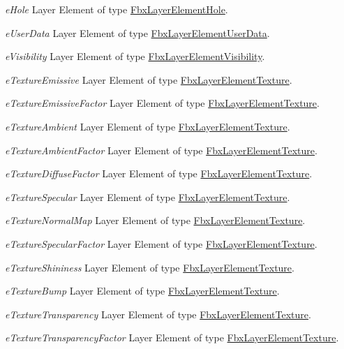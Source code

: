 \begin{DoxyItemize}
\item {\itshape e\+Hole} Layer Element of type \hyperlink{class_fbx_layer_element_hole}{Fbx\+Layer\+Element\+Hole}.
\item {\itshape e\+User\+Data} Layer Element of type \hyperlink{class_fbx_layer_element_user_data}{Fbx\+Layer\+Element\+User\+Data}.
\item {\itshape e\+Visibility} Layer Element of type \hyperlink{class_fbx_layer_element_visibility}{Fbx\+Layer\+Element\+Visibility}.
\item {\itshape e\+Texture\+Emissive} Layer Element of type \hyperlink{class_fbx_layer_element_texture}{Fbx\+Layer\+Element\+Texture}.
\item {\itshape e\+Texture\+Emissive\+Factor} Layer Element of type \hyperlink{class_fbx_layer_element_texture}{Fbx\+Layer\+Element\+Texture}.
\item {\itshape e\+Texture\+Ambient} Layer Element of type \hyperlink{class_fbx_layer_element_texture}{Fbx\+Layer\+Element\+Texture}.
\item {\itshape e\+Texture\+Ambient\+Factor} Layer Element of type \hyperlink{class_fbx_layer_element_texture}{Fbx\+Layer\+Element\+Texture}.
\item {\itshape e\+Texture\+Diffuse\+Factor} Layer Element of type \hyperlink{class_fbx_layer_element_texture}{Fbx\+Layer\+Element\+Texture}.
\item {\itshape e\+Texture\+Specular} Layer Element of type \hyperlink{class_fbx_layer_element_texture}{Fbx\+Layer\+Element\+Texture}.
\item {\itshape e\+Texture\+Normal\+Map} Layer Element of type \hyperlink{class_fbx_layer_element_texture}{Fbx\+Layer\+Element\+Texture}.
\item {\itshape e\+Texture\+Specular\+Factor} Layer Element of type \hyperlink{class_fbx_layer_element_texture}{Fbx\+Layer\+Element\+Texture}.
\item {\itshape e\+Texture\+Shininess} Layer Element of type \hyperlink{class_fbx_layer_element_texture}{Fbx\+Layer\+Element\+Texture}.
\item {\itshape e\+Texture\+Bump} Layer Element of type \hyperlink{class_fbx_layer_element_texture}{Fbx\+Layer\+Element\+Texture}.
\item {\itshape e\+Texture\+Transparency} Layer Element of type \hyperlink{class_fbx_layer_element_texture}{Fbx\+Layer\+Element\+Texture}.
\item {\itshape e\+Texture\+Transparency\+Factor} Layer Element of type \hyperlink{class_fbx_layer_element_texture}{Fbx\+Layer\+Element\+Texture}.

\end{DoxyItemize}

